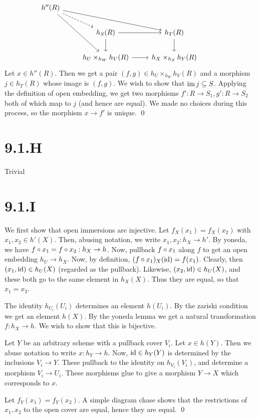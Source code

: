 \documentclass{article}
\begin{document}
\[\begin{tikzcd}
        {h''(R)}
        \\
                 & {h_S(R)}                &
        {h_T(R)} &
        {}
        \\
                 & {h_U\times_{h_W}h_V(R)} &
        {h_X\times_{h_Z}h_Y(R)}
        \arrow[from=2-3, to=3-3]
        \arrow[from=2-2, to=3-2]
        \arrow[from=2-2, to=2-3]
        \arrow[from=3-2, to=3-3]
        \arrow[from=1-1, to=3-2]
        \arrow[from=1-1, to=2-3]
        \arrow[dashed, from=1-1, to=2-2]
    \end{tikzcd}\] Let $x \in h''(R)$. Then we get a pair
$(f,g) \in h_U\times_{h_W}h_V(R)$ and a morphism $j \in h_T(R)$ whose image is
$(f, g)$. We wish to show that $\operatorname{im} j \subseteq S$. Applying
the definition of open embedding, we get two morphisms $f': R \to S_1, g': R \to S_2$
both of which map to $j$ (and hence are equal). We made no
choices during this process, so the morphism $x \to f'$ is unique.
\qed

\section{9.1.H}
Trivial

\section{9.1.I}
We first show that open immersions are injective. Let $f_X(x_1)=f_X(x_2)$
with $x_1, x_2 \in h'(X)$. Then, abusing notation, we write
$x_1, x_2: h_X \to h'$. By yoneda, we have $f\circ x_1=f\circ x_2: h_X \to h$. Now,
pullback $f\circ x_1$ along $f$ to get an open
embedding $h_U \to h_X$. Now, by definition, $(f \circ x_1)_X(\operatorname{id})=f(x_1)$.
Clearly, then $(x_1,\operatorname{id}) \in h_U(X)$ (regarded as the pullback). Likewise,
$(x_2, \operatorname{id}) \in h_U(X)$, and these both go to the same element in
$h_X(X)$. Thus they are equal, so that $x_1 = x_2$.

The identity $h_{U_i}(U_i)$ determines an element
$h(U_i)$. By the zariski condition we get an element
$h(X)$. By the yoneda lemma we get a natural transformation
$f: h_X \to h$. We wish to show that this is bijective.

Let $Y$ be an arbitrary scheme with a pullback cover
$V_i$. Let $x \in h(Y)$. Then we abuse notation to
write $x: h_Y \to h$. Now, $\operatorname{id} \in h_Y(Y)$ is determined by the
inclusions $V_i \to Y$. These pullback to the identity on
$h_{V_i}(V_i)$, and determine a morphism $V_i \to U_i$. These
morphisms glue to give a morphism $Y \to X$ which corresponds to
$x$.

Let $f_Y(x_1)=f_Y(x_2)$. A simple diagram chase shows that the restrictions
of $x_1, x_2$ to the open cover are equal, hence they are equal.
\qed
\end{document}
